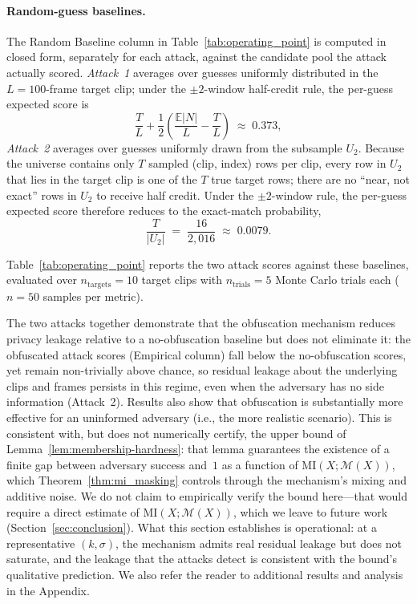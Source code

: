 \documentclass[sigconf,anonymous, review]{acmart}
\newcommand{\MI}{\mathrm{MI}}
\begin{document}
\paragraph{Random-guess baselines.}
The Random Baseline column in Table~\ref{tab:operating_point} is computed in closed form, separately for each attack, against the candidate pool the attack actually scored. \emph{Attack~1} averages over guesses uniformly distributed in the $L = 100$-frame target clip; under the $\pm 2$-window half-credit rule, the per-guess expected score is
\[
\frac{T}{L} + \frac{1}{2}\left(\frac{\mathbb{E}\lvert N\rvert}{L} - \frac{T}{L}\right) \;\approx\; 0.373,
\]
\emph{Attack~2} averages over guesses uniformly drawn from the subsample $U_2$. Because the universe contains only $T$ sampled (clip, index) rows per clip, every row in $U_2$ that lies in the target clip is one of the $T$ true target rows; there are no ``near, not exact'' rows in $U_2$ to receive half credit. Under the $\pm 2$-window rule, the per-guess expected score therefore reduces to the exact-match probability,
\[
\frac{T}{|U_2|} \;=\; \frac{16}{2{,}016} \;\approx\; 0.0079.
\]

Table~\ref{tab:operating_point} reports the two attack scores against these baselines, evaluated over $n_{\mathrm{targets}} = 10$ target clips with $n_{\mathrm{trials}} = 5$ Monte Carlo trials each ($n = 50$ samples per metric).

The two attacks together demonstrate that the obfuscation mechanism reduces privacy leakage relative to a no-obfuscation baseline but does not eliminate it: the obfuscated attack scores (Empirical column) fall below the no-obfuscation scores, yet remain non-trivially above chance, so residual leakage about the underlying clips and frames persists in this regime, even when the adversary has no side information (Attack~2). Results also show that obfuscation is substantially more effective for an uninformed adversary (i.e., the more realistic scenario). This is consistent with, but does not numerically certify, the upper bound of Lemma~\ref{lem:membership-hardness}: that lemma guarantees the existence of a finite gap between adversary success and~$1$ as a function of $\MI(X; \mathcal{M}(X))$, which Theorem~\ref{thm:mi_masking} controls through the mechanism's mixing and additive noise. We do not claim to empirically verify the bound here---that would require a direct estimate of $\MI(X; \mathcal{M}(X))$, which we leave to future work (Section~\ref{sec:conclusion}). What this section establishes is operational: at a representative $(k, \sigma)$, the mechanism admits real residual leakage but does not saturate, and the leakage that the attacks detect is consistent with the bound's qualitative prediction. We also refer the reader to additional results and analysis in the Appendix.
\end{document}
